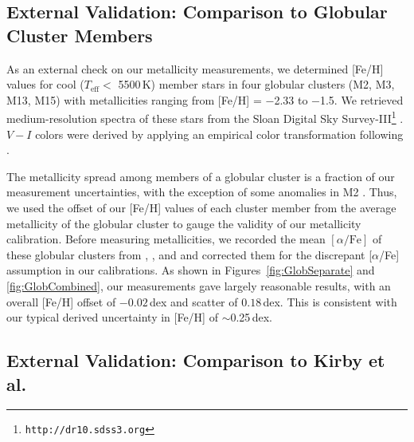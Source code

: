 \documentclass{emulateapj-rtx4}
\begin{document}

\subsection{External Validation: Comparison to Globular Cluster Members}

As an external check on our metallicity measurements,
we determined [Fe/H] values for cool ($T_{\text{eff}} < $ 5500\,K) member stars in four 
globular clusters (M2, M3, M13, M15) with metallicities ranging from [Fe/H] = $-$2.33 to $-$1.5.
We retrieved medium-resolution spectra of these stars from
the Sloan Digital Sky Survey-III\footnote[1]{\texttt{http://dr10.sdss3.org}} \citep{ewa+11, aaa+14}. 
$V-I$ colors were derived by applying an empirical 
color transformation following \citet{jga+06}.

The metallicity spread among members of a globular cluster is a fraction of our measurement uncertainties,
with the exception of some anomalies in M2 \citep{yrg+14}. 
Thus, we used the offset of our [Fe/H] values of each cluster member 
from the average metallicity of the globular cluster to gauge the validity of our metallicity calibration.
Before measuring metallicities, we recorded the mean $[\alpha/\text{Fe}]$ of these
globular clusters from \citet{c+96}, \citet{kgs+08}, and \citet{yrg+14} and corrected them for the discrepant [$\alpha$/Fe]
assumption in our calibrations. As shown in Figures~\ref{fig:GlobSeparate} and \ref{fig:GlobCombined}, 
our measurements gave largely reasonable results, with an overall [Fe/H] offset of $-0.02\,$dex and 
scatter of $0.18\,$dex. This is consistent with our typical derived uncertainty in [Fe/H] of
$\sim$0.25\,dex.

\subsection{External Validation: Comparison to Kirby et al.}
\label{sec:Kirby13}
\end{document}
